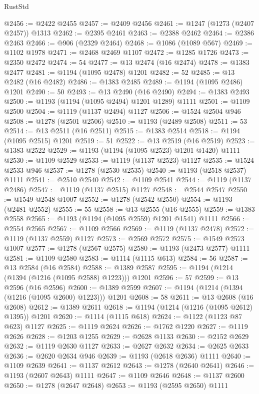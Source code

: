 \begin{lexlean}{RustStd}
\begin{coremodule}
@2456 := @2422 @2455
@2457 := @2409 @2456
@2461 := @1247 (@1273 (@2407 @2457)) @1313
@2462 := @2395 @2461
@2463 := @2388 @2462
@2464 := @2386 @2463
@2466 := @906 (@2329 @2464)
@2468 := @1086 (@1089 @567)
@2469 := @1102 @1978
@2471 := @2468 @2469 @1107
@2472 := @1285 @1726
@2473 := @2350 @2472
@2474 := 54
@2477 := @13 @2474 (@16 @2474)
@2478 := @1383 @2477
@2481 := @1194 (@1095 @2478) @1201
@2482 := 52
@2485 := @13 @2482 (@16 @2482)
@2486 := @1383 @2485
@2489 := @1194 (@1095 @2486) @1201
@2490 := 50
@2493 := @13 @2490 (@16 @2490)
@2494 := @1383 @2493
@2500 := @1193 (@1194 (@1095 @2494) @1201 @1289) @1111
@2501 := @1109 @2500
@2504 := @1119 (@1137 @2494) @1127
@2506 := @1524 @2504 @946
@2508 := @1278 (@2501 @2506)
@2510 := @1193 (@2489 @2508)
@2511 := 53
@2514 := @13 @2511 (@16 @2511)
@2515 := @1383 @2514
@2518 := @1194 (@1095 @2515) @1201
@2519 := 51
@2522 := @13 @2519 (@16 @2519)
@2523 := @1383 @2522
@2529 := @1193 (@1194 (@1095 @2523) @1201 @1420) @1111
@2530 := @1109 @2529
@2533 := @1119 (@1137 @2523) @1127
@2535 := @1524 @2533 @946
@2537 := @1278 (@2530 @2535)
@2540 := @1193 (@2518 @2537) @1111
@2541 := @2510 @2540
@2542 := @1109 @2541
@2544 := @1119 (@1137 @2486)
@2547 := @1119 (@1137 @2515) @1127
@2548 := @2544 @2547
@2550 := @1549 @2548 @1007
@2552 := @1278 (@2542 @2550)
@2554 := @1193 (@2481 @2552)
@2555 := 55
@2558 := @13 @2555 (@16 @2555)
@2559 := @1383 @2558
@2565 := @1193 (@1194 (@1095 @2559) @1201 @1541) @1111
@2566 := @2554 @2565
@2567 := @1109 @2566
@2569 := @1119 (@1137 @2478)
@2572 := @1119 (@1137 @2559) @1127
@2573 := @2569 @2572
@2575 := @1549 @2573 @1007
@2577 := @1278 (@2567 @2575)
@2580 := @1193 (@2473 @2577) @1111
@2581 := @1109 @2580
@2583 := @1114 (@1115 @613)
@2584 := 56
@2587 := @13 @2584 (@16 @2584)
@2588 := @1389 @2587
@2595 := @1194 (@1214 (@1394 (@1216 (@1095 @2588) @1223))) @1201
@2596 := 57
@2599 := @13 @2596 (@16 @2596)
@2600 := @1389 @2599
@2607 := @1194 (@1214 (@1394 (@1216 (@1095 @2600) @1223))) @1201
@2608 := 58
@2611 := @13 @2608 (@16 @2608)
@2612 := @1389 @2611
@2618 := @1194 (@1214 (@1216 (@1095 @2612) @1395)) @1201
@2620 := @1114 (@1115 @618)
@2624 := @1122 (@1123 @87 @623) @1127
@2625 := @1119 @2624
@2626 := @1762 @1220
@2627 := @1119 @2626
@2628 := @1203 @1255
@2629 := @2628 @1133
@2630 := @2152 @2629
@2632 := @1119 @2630 @1127
@2633 := @2627 @2632
@2634 := @2625 @2633
@2636 := @2620 @2634 @946
@2639 := @1193 (@2618 @2636) @1111
@2640 := @1109 @2639
@2641 := @1137 @2612
@2643 := @1278 (@2640 @2641)
@2646 := @1193 (@2607 @2643) @1111
@2647 := @1109 @2646
@2648 := @1137 @2600
@2650 := @1278 (@2647 @2648)
@2653 := @1193 (@2595 @2650) @1111

\end{coremodule}
\end{lexlean}
